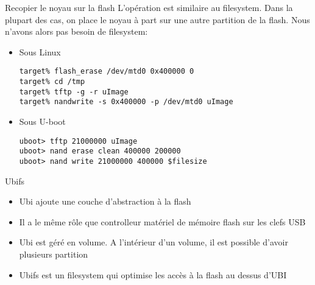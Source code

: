 \begin{frame}[fragile=singleslide]{Recopier le noyau sur la flash}
  L'opération est similaire au filesystem. Dans la plupart des cas, on
  place le  noyau à  part sur  une autre partition  de la  flash. Nous
  n'avons alors pas besoin de filesystem:
  \begin{itemize}
  \item Sous Linux
    \begin{lstlisting}
target% flash_erase /dev/mtd0 0x400000 0
target% cd /tmp
target% tftp -g -r uImage
target% nandwrite -s 0x400000 -p /dev/mtd0 uImage
    \end{lstlisting}
  \item Sous U-boot
    \begin{lstlisting}
uboot> tftp 21000000 uImage
uboot> nand erase clean 400000 200000
uboot> nand write 21000000 400000 $filesize
    \end{lstlisting}
  \end{itemize}
\end{frame}


\begin{frame}[fragile=singleslide]{Ubifs}
  \begin{itemize}
  \item Ubi ajoute une couche d'abstraction à la flash
  \item Il a le même rôle que controlleur matériel de mémoire flash sur les clefs USB
  \item Ubi est géré en volume. A l'intérieur d'un volume, il est possible d'avoir plusieurs partition
  \item Ubifs est un filesystem qui optimise les accès à la flash au dessus d'UBI
  \end{itemize}
\end{frame}
  
